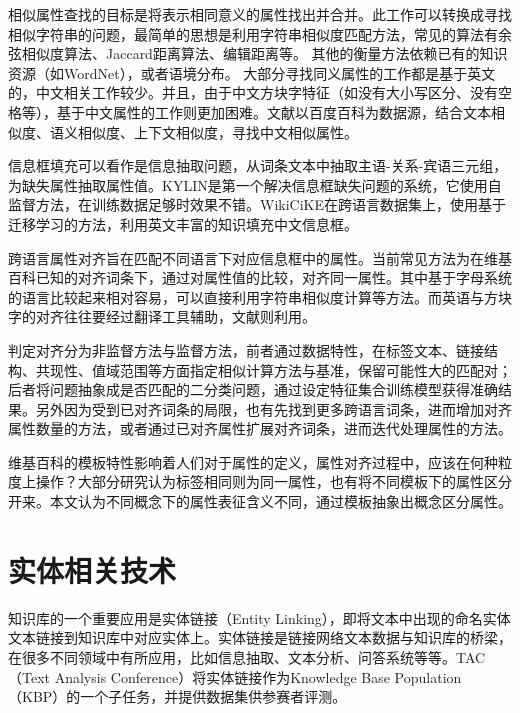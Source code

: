{\heiti 相似属性查找}的目标是将表示相同意义的属性找出并合并。此工作可以转换成寻找相似字符串的问题，最简单的思想是利用字符串相似度匹配方法，常见的算法有余弦相似度算法、Jaccard距离算法、编辑距离等。
其他的衡量方法依赖已有的知识资源（如WordNet）\cite{yang2005measuring}，或者语境分布\cite{pantel2009web}。
大部分寻找同义属性的工作都是基于英文的，中文相关工作较少。并且，由于中文方块字特征（如没有大小写区分、没有空格等），基于中文属性的工作则更加困难。文献\cite{liu2014extracting}以百度百科为数据源，结合文本相似度、语义相似度、上下文相似度，寻找中文相似属性。

{\heiti 信息框填充}可以看作是信息抽取问题，从词条文本中抽取主语-关系-宾语三元组，为缺失属性抽取属性值。KYLIN\cite{wu2007autonomously}是第一个解决信息框缺失问题的系统，它使用自监督方法，在训练数据足够时效果不错。WikiCiKE\cite{wang2013transfer}在跨语言数据集上，使用基于迁移学习的方法，利用英文丰富的知识填充中文信息框。

{\heiti 跨语言属性对齐}旨在匹配不同语言下对应信息框中的属性。当前常见方法为在维基百科已知的对齐词条下，通过对属性值的比较，对齐同一属性。其中基于字母系统的语言比较起来相对容易，可以直接利用字符串相似度计算等方法\cite{bouma2009cross}。而英语与方块字的对齐往往要经过翻译工具辅助\cite{fu2009cross}，文献\cite{nguyen2011multilingual}则利用。

判定对齐分为非监督方法与监督方法，前者通过数据特性，在标签文本、链接结构、共现性、值域范围等方面指定相似计算方法与基准，保留可能性大的匹配对\cite{nguyen2011multilingual,lin2011unsupervised}；后者将问题抽象成是否匹配的二分类问题\cite{adar2009information}，通过设定特征集合训练模型获得准确结果。另外因为受到已对齐词条的局限，也有先找到更多跨语言词条，进而增加对齐属性数量的方法\cite{rinser2013cross}，或者通过已对齐属性扩展对齐词条，进而迭代处理属性的方法\cite{nguyen2013slint}。

维基百科的模板特性影响着人们对于属性的定义，属性对齐过程中，应该在何种粒度上操作？大部分研究认为标签相同则为同一属性\cite{adar2009information,nguyen2011multilingual}，也有将不同模板下的属性区分开来\cite{bouma2009cross}。本文认为不同概念下的属性表征含义不同，通过模板抽象出概念区分属性。

\section{实体相关技术}
\label{sec:entity-research}

知识库的一个重要应用是实体链接（Entity Linking），即将文本中出现的命名实体文本链接到知识库中对应实体上。实体链接是链接网络文本数据与知识库的桥梁，在很多不同领域中有所应用，比如信息抽取\cite{lin2012entity,nakashole2012patty}、文本分析\cite{gattani2013entity}、问答系统\cite{gattani2013entity,welty2012comparison}等等。TAC（Text Analysis Conference）将实体链接作为Knowledge Base Population（KBP）的一个子任务，并提供数据集供参赛者评测。

